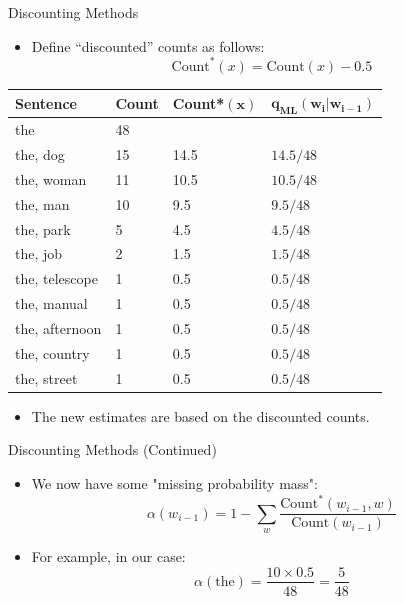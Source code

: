 \documentclass[handout]{beamer}
\begin{document}
\begin{frame}{Discounting Methods}
\begin{scriptsize}
\begin{itemize}
\item Define ``discounted'' counts as follows:
\begin{displaymath}
\text{Count}^*(x) =\text{Count}(x)-0.5
\end{displaymath}

\end{itemize}

\begin{table}[h]
    \centering
    \begin{tabular}{llll}
        \textbf{Sentence} & \textbf{Count} & \textbf{Count}*$\mathbf{(x)}$ & $\mathbf{q_{\text{ML}}(w_i | w_{i-1})}$ \\
        \hline
        the & 48 & & \\
        the, dog & 15 & 14.5 & $14.5/48$ \\
        the, woman & 11 & 10.5 & $10.5/48$ \\
        the, man & 10 & 9.5 & $9.5/48$ \\
        the, park & 5 & 4.5 & $4.5/48$ \\
        the, job & 2 & 1.5 & $1.5/48$ \\
        the, telescope & 1 & 0.5 & $0.5/48$ \\
        the, manual & 1 & 0.5 & $0.5/48$ \\
        the, afternoon & 1 & 0.5 & $0.5/48$ \\
        the, country & 1 & 0.5 & $0.5/48$ \\
        the, street & 1 & 0.5 & $0.5/48$ \\
    \end{tabular}
\end{table}

\begin{itemize}
    \item The new estimates are based on the discounted counts.
\end{itemize}
\end{scriptsize}
\end{frame}



\begin{frame}{Discounting Methods (Continued)}
    \begin{itemize}
        \item We now have some "missing probability mass":
        \[
        \alpha(w_{i-1}) = 1 - \sum_{w} \frac{{\text{{Count}}^*(w_{i-1}, w)}}{{\text{{Count}}(w_{i-1})}}
        \]
        \item For example, in our case:
        \[
        \alpha(\text{{the}}) = \frac{{10 \times 0.5}}{{48}} = \frac{{5}}{{48}}
        \]
    \end{itemize}
\end{frame}
\end{document}
